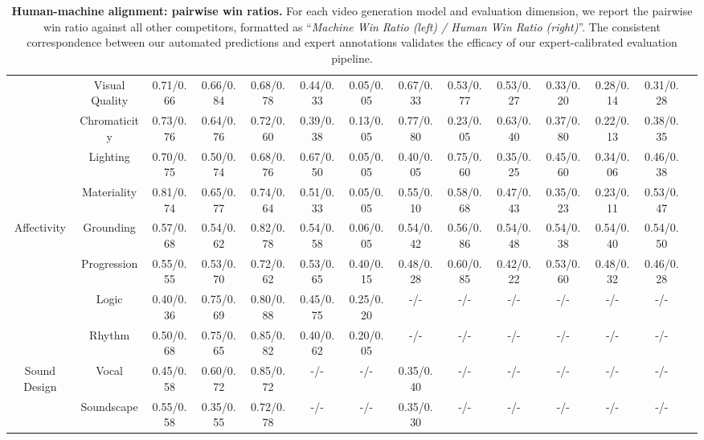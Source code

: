 \documentclass{llmxive}
\begin{document}
\begin{table}[t]
{\begin{tabular}{cccccccccccccc}
\rowcolor[HTML]{E6F2FF}  
& Visual Quality & 0.71/0.66 & 0.66/0.84 & 0.68/0.78 & 0.44/0.33 & 0.05/0.05 & 0.67/0.33 & 0.53/0.77 & 0.53/0.27 & 0.33/0.20 & 0.28/0.14 & 0.31/0.28 \\ 
\rowcolor[HTML]{E6F2FF} 
& Chromaticity & 0.73/0.76 & 0.64/0.76 & 0.72/0.60 & 0.39/0.38 & 0.13/0.05 & 0.77/0.80 & 0.23/0.05 & 0.63/0.40 & 0.37/0.80 & 0.22/0.13 & 0.38/0.35 \\ 
\rowcolor[HTML]{E6F2FF} 
& Lighting & 0.70/0.75 & 0.50/0.74 & 0.68/0.76 & 0.67/0.50 & 0.05/0.05 & 0.40/0.05 & 0.75/0.60 & 0.35/0.25 & 0.45/0.60 & 0.34/0.06 & 0.46/0.38 \\ 
\rowcolor[HTML]{E6F2FF} 
\multirow{-4}{*}{Aesthetics}
& Materiality & 0.81/0.74 & 0.65/0.77 & 0.74/0.64 & 0.51/0.33 & 0.05/0.05 & 0.55/0.10 & 0.58/0.68 & 0.47/0.43 & 0.35/0.23 & 0.23/0.11 & 0.53/0.47 \\ 


\multirow{2}{*}{Affectivity} 
& Grounding & 0.57/0.68 & 0.54/0.62 & 0.82/0.78 & 0.54/0.58 & 0.06/0.05 & 0.54/0.42 & 0.56/0.86 & 0.54/0.48 & 0.54/0.38 & 0.54/0.40 & 0.54/0.50 \\ 
& Progression & 0.55/0.55 & 0.53/0.70 & 0.72/0.62 & 0.53/0.65 & 0.40/0.15 & 0.48/0.28 & 0.60/0.85 & 0.42/0.22 & 0.53/0.60 & 0.48/0.32 & 0.46/0.28 \\ 	

\rowcolor[HTML]{E6F2FF} 
& Logic & 0.40/0.36 & 0.75/0.69 & 0.80/0.88 & 0.45/0.75 & 0.25/0.20 & -/- & -/- & -/- & -/- & -/- & -/- \\ 
\rowcolor[HTML]{E6F2FF} 
\multirow{-2}{*}{\Centerstack{Multi-Shot}} 
& Rhythm & 0.50/0.68 & 0.75/0.65 & 0.85/0.82 & 0.40/0.62 & 0.20/0.05 & -/- & -/- & -/- & -/- & -/- & -/- \\ 


\multirow{2}{*}{Sound Design} 
& Vocal & 0.45/0.58 & 0.60/0.72 & 0.85/0.72 & -/- & -/- & 0.35/0.40 & -/- & -/- & -/- & -/- & -/- \\ 
& Soundscape & 0.55/0.58 & 0.35/0.55 & 0.72/0.78 & -/- & -/- & 0.35/0.30 & -/- & -/- & -/- & -/- & -/- \\ 

\hline
\end{tabular}
}
\label{tab:win_ratio}
\caption{\textbf{Human-machine alignment: pairwise win ratios.} For each video generation model and evaluation dimension, we report the pairwise win ratio against all other competitors, formatted as ``\textit{Machine Win Ratio (left) / Human Win Ratio (right)}''. The consistent correspondence between our automated predictions and expert annotations validates the efficacy of our expert-calibrated evaluation pipeline.}
\end{table}
\end{document}
